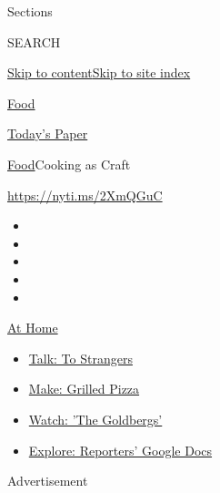 Sections

SEARCH

\protect\hyperlink{site-content}{Skip to
content}\protect\hyperlink{site-index}{Skip to site index}

\href{https://www.nytimes3xbfgragh.onion/section/food}{Food}

\href{https://myaccount.nytimes3xbfgragh.onion/auth/login?response_type=cookie\&client_id=vi}{}

\href{https://www.nytimes3xbfgragh.onion/section/todayspaper}{Today's
Paper}

\href{/section/food}{Food}\textbar{}Cooking as Craft

\url{https://nyti.ms/2XmQGuC}

\begin{itemize}
\item
\item
\item
\item
\item
\end{itemize}

\href{https://www.nytimes3xbfgragh.onion/spotlight/at-home?action=click\&pgtype=Article\&state=default\&region=TOP_BANNER\&context=at_home_menu}{At
Home}

\begin{itemize}
\tightlist
\item
  \href{https://www.nytimes3xbfgragh.onion/2020/08/03/well/family/the-benefits-of-talking-to-strangers.html?action=click\&pgtype=Article\&state=default\&region=TOP_BANNER\&context=at_home_menu}{Talk:
  To Strangers}
\item
  \href{https://www.nytimes3xbfgragh.onion/2020/08/01/at-home/coronavirus-make-pizza-on-a-grill.html?action=click\&pgtype=Article\&state=default\&region=TOP_BANNER\&context=at_home_menu}{Make:
  Grilled Pizza}
\item
  \href{https://www.nytimes3xbfgragh.onion/2020/07/31/arts/television/goldbergs-abc-stream.html?action=click\&pgtype=Article\&state=default\&region=TOP_BANNER\&context=at_home_menu}{Watch:
  'The Goldbergs'}
\item
  \href{https://www.nytimes3xbfgragh.onion/interactive/2020/at-home/even-more-reporters-editors-diaries-lists-recommendations.html?action=click\&pgtype=Article\&state=default\&region=TOP_BANNER\&context=at_home_menu}{Explore:
  Reporters' Google Docs}
\end{itemize}

Advertisement

